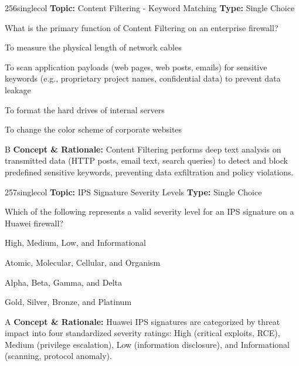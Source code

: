 \begin{qcard}{256}{singlecol}
\textcolor{darkslate!75}{\small\textbf{Topic:} Content Filtering - Keyword Matching \hfill \textbf{Type:} Single Choice}\vspace{0.4em}\par
What is the primary function of Content Filtering on an enterprise firewall?
\begin{qoptions}
\item To measure the physical length of network cables
\item To scan application payloads (web pages, web posts, emails) for sensitive keywords (e.g., proprietary project names, confidential data) to prevent data leakage
\item To format the hard drives of internal servers
\item To change the color scheme of corporate websites
\end{qoptions}
\end{qcard}
\nopagebreak
\begin{explainbox}{B}
\textbf{Concept \& Rationale:} Content Filtering performs deep text analysis on transmitted data (HTTP posts, email text, search queries) to detect and block predefined sensitive keywords, preventing data exfiltration and policy violations.
\end{explainbox}

\begin{qcard}{257}{singlecol}
\textcolor{darkslate!75}{\small\textbf{Topic:} IPS Signature Severity Levels \hfill \textbf{Type:} Single Choice}\vspace{0.4em}\par
Which of the following represents a valid severity level for an IPS signature on a Huawei firewall?
\begin{qoptions}
\item High, Medium, Low, and Informational
\item Atomic, Molecular, Cellular, and Organism
\item Alpha, Beta, Gamma, and Delta
\item Gold, Silver, Bronze, and Platinum
\end{qoptions}
\end{qcard}
\nopagebreak
\begin{explainbox}{A}
\textbf{Concept \& Rationale:} Huawei IPS signatures are categorized by threat impact into four standardized severity ratings: High (critical exploits, RCE), Medium (privilege escalation), Low (information disclosure), and Informational (scanning, protocol anomaly).
\end{explainbox}

